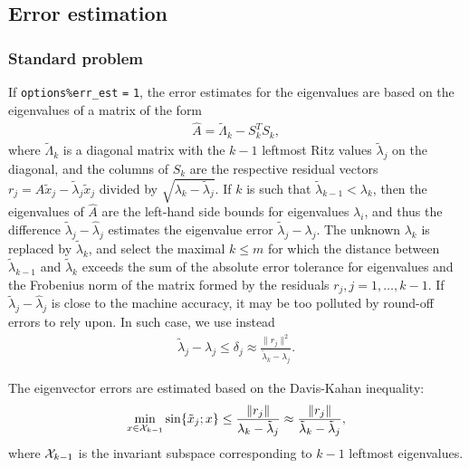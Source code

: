 \subsection{Error estimation}

\label{sec:err.est}

\subsubsection{Standard problem}

If {\tt options\%err\_est} {\tt =} {\tt 1}, 
the error estimates for the eigenvalues are based on 
the eigenvalues of a matrix of the form
%
\begin{eqnarray}
\label{L.mx}
\hat A = \tilde\Lambda_k - S_k^T S_k,
\end{eqnarray}
%
where $\tilde\Lambda_k$ is a diagonal matrix with
the $k-1$ leftmost Ritz values $\tilde\lambda_j$
on the diagonal,
and the columns of $S_k$ are the respective
residual vectors $r_j = A \tilde x_j - \tilde\lambda_j \tilde x_j$
divided by $\sqrt{\lambda_k - \tilde\lambda_j}$.
If $k$ is such that
$\tilde\lambda_{k-1} < \lambda_k$,
then the eigenvalues of $\hat A$ are
the left-hand side bounds for
eigenvalues $\lambda_i$,
and thus
the difference $\tilde\lambda_j - \hat\lambda_j$ estimates
the eigenvalue error $\tilde\lambda_j - \lambda_j$.
The unknown  $\lambda_k$ is replaced by $\tilde\lambda_k$,
and select the maximal $k \le m$ for which
the distance between $\tilde\lambda_{k-1}$ and $\tilde\lambda_k$
exceeds the sum of the absolute error tolerance for eigenvalues
and the Frobenius norm of the matrix formed by the residuals
$r_j, j = 1,\ldots,k-1$.
If  $\tilde\lambda_j - \hat\lambda_j$
is close to the machine accuracy, it may be too polluted
by round-off errors to rely upon.
In such case, we use instead
%
\begin{eqnarray}
\label{aL}
\tilde\lambda_j - \lambda_j \le \delta_j \approx
\frac{\|r_j\|^2}{\tilde\lambda_k - \lambda_j}.
\end{eqnarray}

The eigenvector errors are estimated based on 
the Davis-Kahan inequality:
%
\begin{eqnarray}
\label{DK}
\min_{x \in {\cal X}_{k-1}}
\sin\{\tilde x_j; x\} \le
\frac{\|r_j\|}{\lambda_k - \tilde\lambda_j} \approx
\frac{\|r_j\|}{\tilde\lambda_k - \tilde\lambda_j},
\end{eqnarray}
%
where ${\cal X}_{k-1}$ is the invariant subspace 
corresponding to $k-1$ leftmost eigenvalues.


